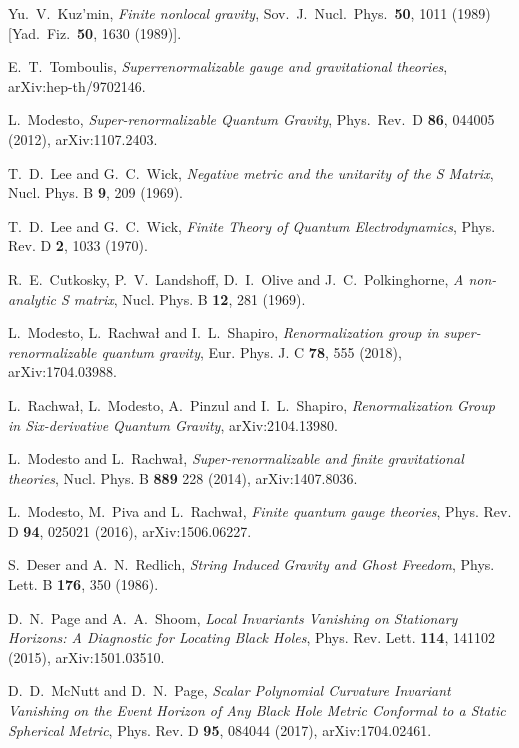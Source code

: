 \documentclass[aps,prd,a4paper,twocolumn,showpacs,showkeys,preprintnumbers,amsmath,amssymb,nofootinbib,usenames,dvipsnames]{revtex4-2}
\begin{document}
\begin{thebibliography}{99}
  Yu.~V.~Kuz'min,
  {\it Finite nonlocal gravity},
  Sov.\ J.\ Nucl.\ Phys.\  {\bf 50}, 1011 (1989)
  [Yad.\ Fiz.\  {\bf 50}, 1630 (1989)].

E.~T.~Tomboulis,
{\it Superrenormalizable gauge and gravitational theories},
arXiv:hep-th/9702146.

L.~Modesto,
{\it Super-renormalizable Quantum Gravity},
Phys.\ Rev.\ D {\bf 86}, 044005 (2012), arXiv:1107.2403.

T.~D.~Lee and G.~C.~Wick,
{\it Negative metric and the unitarity of the S Matrix},
Nucl. Phys. B \textbf{9}, 209 (1969).

T.~D.~Lee and G.~C.~Wick,
{\it Finite Theory of Quantum Electrodynamics},
Phys. Rev. D \textbf{2}, 1033 (1970).

R.~E.~Cutkosky, P.~V.~Landshoff, D.~I.~Olive and J.~C.~Polkinghorne,
{\it A non-analytic S matrix},
Nucl. Phys. B \textbf{12}, 281 (1969).

L.~Modesto, L.~Rachwa\l{} and I.~L.~Shapiro,
{\it Renormalization group in super-renormalizable quantum gravity},
Eur. Phys. J. C \textbf{78}, 555 (2018),
arXiv:1704.03988.

L.~Rachwa\l{}, L.~Modesto, A.~Pinzul and I.~L.~Shapiro,
{\it Renormalization Group in Six-derivative Quantum Gravity},
arXiv:2104.13980.

L.~Modesto and L.~Rachwa\l{},
{\it Super-renormalizable and finite gravitational theories},
Nucl. Phys. B \textbf{889} 228 (2014), 
arXiv:1407.8036.

L.~Modesto, M.~Piva and L.~Rachwa\l{},
{\it Finite quantum gauge theories},
Phys. Rev. D \textbf{94}, 025021 (2016),
arXiv:1506.06227.

S.~Deser and A.~N.~Redlich,
{\it String Induced Gravity and Ghost Freedom},
Phys. Lett. B \textbf{176}, 350 (1986).

D.~N.~Page and A.~A.~Shoom,
{\it Local Invariants Vanishing on Stationary Horizons: A Diagnostic for Locating Black Holes},
Phys. Rev. Lett. \textbf{114}, 141102 (2015),
arXiv:1501.03510.

D.~D.~McNutt and D.~N.~Page,
{\it Scalar Polynomial Curvature Invariant Vanishing on the Event Horizon of Any 
Black Hole Metric Conformal to a Static Spherical Metric},
Phys. Rev. D \textbf{95}, 084044 (2017),
arXiv:1704.02461.


\end{thebibliography}
\end{document}

